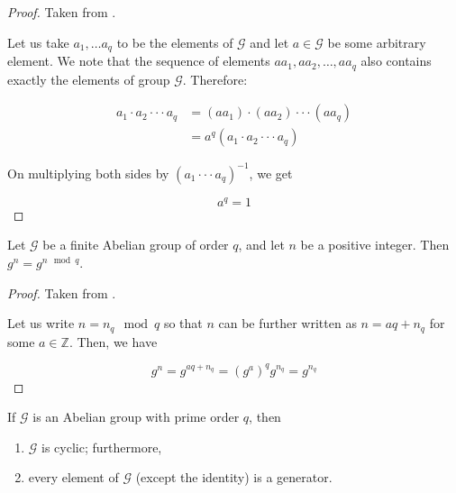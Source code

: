 \begin{proof}

Taken from \cite{koocmsc}.

Let us take $ a_1, \ldots a_q $ to be the elements of $\mathcal{G}$ and let $ a \in \mathcal{G} $ be some arbitrary element. We note that the sequence of elements $ aa_1, aa_2, \ldots , aa_q $ also contains exactly the elements of group $ \mathcal{G} $. Therefore:

\begin{equation*}
\begin{split}
a_1 \cdot a_2 \cdot \cdot \cdot a_q
&= (aa_1) \cdot (aa_2) \cdot \cdot \cdot (aa_q)\\
&= a^q (a_1 \cdot a_2 \cdot \cdot \cdot a_q)
\end{split}
\end{equation*}

On multiplying both sides by $ (a_1 \cdot \cdot \cdot a_q)^{-1} $, we get 

\begin{equation*}
a^q = 1
\end{equation*}
\end{proof}

\begin{corollary}
Let $ \mathcal{G} $ be a finite Abelian group of order $ q $, and let $ n $ be a positive integer.
Then $ g^n = g^{n \mod q} $.
\end{corollary}

\begin{proof}

Taken from \cite{koocmsc}.

Let us write $ n = n_q \mod q $ so that $ n $ can be further written as $ n = aq + n_q $ for some $ a \in \mathbb{Z} $. Then, we have

\begin{equation*}
g^n = g^{aq+n_q} = (g^a)^q g^{n_q} = g^{n_q}
\end{equation*}
\end{proof}

\begin{lemma}
If $ \mathcal{G} $ is an Abelian group with prime order $ q $, then 
\begin{enumerate}
    \item $ \mathcal{G} $ is cyclic; furthermore,
    \item every element of $ \mathcal{G} $ (except the identity) is a generator.
\end{enumerate}
\end{lemma}


